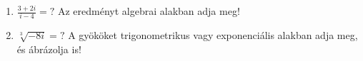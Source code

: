 \documentclass[11pt]{scrartcl}
\begin{document}
\begin{enumerate}
	\item \(\displaystyle
	      \frac{3 + 2i}{i - 4} = ?
	      \) Az eredményt algebrai alakban adja meg!

	\item $\sqrt[3]{-8i} = ?$ A gyököket trigonometrikus vagy exponenciális
	      alakban adja meg, és ábrázolja is!
\end{enumerate}
\end{document}
